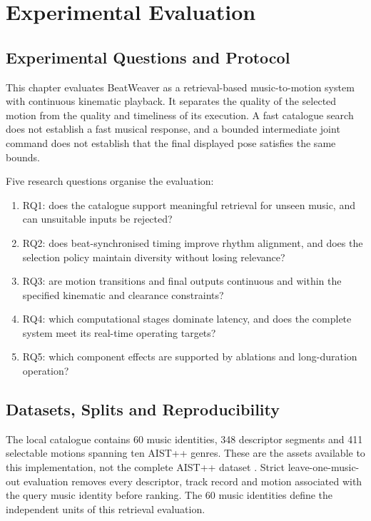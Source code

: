 \chapter{Experimental Evaluation}
\label{chap:experimental_evaluation}

\section{Experimental Questions and Protocol}

This chapter evaluates BeatWeaver as a retrieval-based music-to-motion
system with continuous kinematic playback. It separates the quality of the
selected motion from the quality and timeliness of its execution. A fast
catalogue search does not establish a fast musical response, and a bounded
intermediate joint command does not establish that the final displayed pose
satisfies the same bounds.

Five research questions organise the evaluation:
\begin{enumerate}
    \item RQ1: does the catalogue support meaningful retrieval for unseen music,
          and can unsuitable inputs be rejected?
    \item RQ2: does beat-synchronised timing improve rhythm alignment, and does
          the selection policy maintain diversity without losing relevance?
    \item RQ3: are motion transitions and final outputs continuous and within
          the specified kinematic and clearance constraints?
    \item RQ4: which computational stages dominate latency, and does the
          complete system meet its real-time operating targets?
    \item RQ5: which component effects are supported by ablations and
          long-duration operation?
\end{enumerate}



\section{Datasets, Splits and Reproducibility}

The local catalogue contains 60 music identities, 348 descriptor segments and
411 selectable motions spanning ten AIST++ genres. These are the assets
available to this implementation, not the complete AIST++ dataset
\cite{li2021ai}. Strict leave-one-music-out evaluation removes every descriptor,
track record and motion associated with the query music identity before ranking.
The 60 music identities define the
independent units of this retrieval evaluation.

